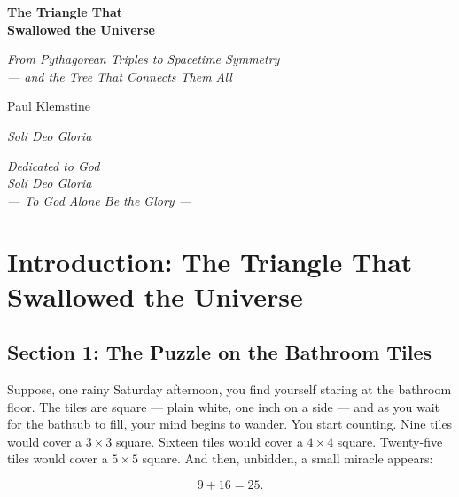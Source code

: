 \documentclass[12pt, letterpaper, openany]{book}
\theoremstyle{definition}
\theoremstyle{remark}
\begin{document}
\begin{titlepage}
\centering
\vspace*{2cm}
{\Huge\bfseries The Triangle That\\[0.3em] Swallowed the Universe\par}
\vspace{1.5cm}
{\Large\itshape From Pythagorean Triples to Spacetime Symmetry\\[0.3em]
--- and the Tree That Connects Them All\par}
\vspace{3cm}
{\LARGE Paul Klemstine\par}
\vfill
{\large\itshape Soli Deo Gloria\par}
\vspace{2cm}
\end{titlepage}

\thispagestyle{empty}
\vspace*{\fill}
\begin{center}
\Large\itshape
Dedicated to God\\[1em]
\normalsize
\textit{Soli Deo Gloria}\\[0.5em]
--- To God Alone Be the Glory ---
\end{center}
\vspace*{\fill}
\newpage

\tableofcontents
\newpage

\chapter*{Introduction: The Triangle That Swallowed the Universe}



\section*{Section 1: The Puzzle on the Bathroom Tiles}


Suppose, one rainy Saturday afternoon, you find yourself staring at the bathroom floor. The tiles are square --- plain white, one inch on a side --- and as you wait for the bathtub to fill, your mind begins to wander. You start counting. Nine tiles would cover a $3 \times 3$ square. Sixteen tiles would cover a $4 \times 4$ square. Twenty-five tiles would cover a $5 \times 5$ square. And then, unbidden, a small miracle appears:

\[
9 + 16 = 25.
\]
\end{document}
